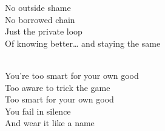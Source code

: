 \begin{lyrics}
No outside shame\\
No borrowed chain\\
Just the private loop\\
Of knowing better… and staying the same

\\
You’re too smart for your own good\\
Too aware to trick the game\\
Too smart for your own good\\
You fail in silence\\
And wear it like a name

\end{lyrics}

